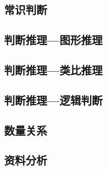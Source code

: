 \documentclass{article}
\numberwithin{equation}{section}						%
\numberwithin{figure}{section}							%
\newtheorem{key-point}{Key-point}
\begin{document}
\begin{sloppypar}
\subsection{常识判断}


\subsection{判断推理---图形推理}




\subsection{判断推理---类比推理}




\subsection{判断推理---逻辑判断}




\subsection{数量关系}




\subsection{资料分析}

\end{sloppypar}
\end{document}
